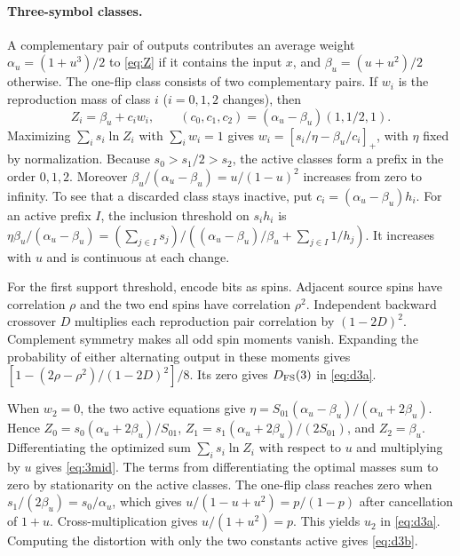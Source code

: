 \documentclass[11pt,letterpaper]{article}
\theoremstyle{definition}
\begin{document}
\paragraph{Three-symbol classes.}
A complementary pair of outputs contributes an average weight $\alpha_u=(1+u^3)/2$ to \eqref{eq:Z} if it contains the input $x$, and $\beta_u=(u+u^2)/2$ otherwise. The one-flip class consists of two complementary pairs. If $w_i$ is the reproduction mass of class $i$ ($i=0,1,2$ changes), then
\[
 Z_i=\beta_u+c_iw_i,\qquad (c_0,c_1,c_2)=(\alpha_u-\beta_u)(1,1/2,1).
\]
Maximizing $\sum_i s_i\ln Z_i$ with $\sum_iw_i=1$ gives $w_i=[s_i/\eta-\beta_u/c_i]_+$, with $\eta$ fixed by normalization. Because $s_0>s_1/2>s_2$, the active classes form a prefix in the order $0,1,2$. Moreover $\beta_u/(\alpha_u-\beta_u)=u/(1-u)^2$ increases from zero to infinity. To see that a discarded class stays inactive, put $c_i=(\alpha_u-\beta_u)h_i$. For an active prefix $I$, the inclusion threshold on $s_i h_i$ is $\eta \beta_u/(\alpha_u-\beta_u)=(\sum_{j\in I}s_j)/((\alpha_u-\beta_u)/\beta_u+\sum_{j\in I}1/h_j)$. It increases with $u$ and is continuous at each change.

For the first support threshold, encode bits as spins. Adjacent source spins have correlation $\rho$ and the two end spins have correlation $\rho^2$. Independent backward crossover $D$ multiplies each reproduction pair correlation by $(1-2D)^2$. Complement symmetry makes all odd spin moments vanish. Expanding the probability of either alternating output in these moments gives $[1-(2\rho-\rho^2)/(1-2D)^2]/8$. Its zero gives $D_{\rm FS}(3)$ in \eqref{eq:d3a}.

When $w_2=0$, the two active equations give $\eta=S_{01}(\alpha_u-\beta_u)/(\alpha_u+2\beta_u)$. Hence $Z_0=s_0(\alpha_u+2\beta_u)/S_{01}$, $Z_1=s_1(\alpha_u+2\beta_u)/(2S_{01})$, and $Z_2=\beta_u$. Differentiating the optimized sum $\sum_i s_i\ln Z_i$ with respect to $u$ and multiplying by $u$ gives \eqref{eq:3mid}. The terms from differentiating the optimal masses sum to zero by stationarity on the active classes. The one-flip class reaches zero when $s_1/(2\beta_u)=s_0/\alpha_u$, which gives $u/(1-u+u^2)=p/(1-p)$ after cancellation of $1+u$. Cross-multiplication gives $u/(1+u^2)=p$. This yields $u_2$ in \eqref{eq:d3a}. Computing the distortion with only the two constants active gives \eqref{eq:d3b}.
\end{document}
